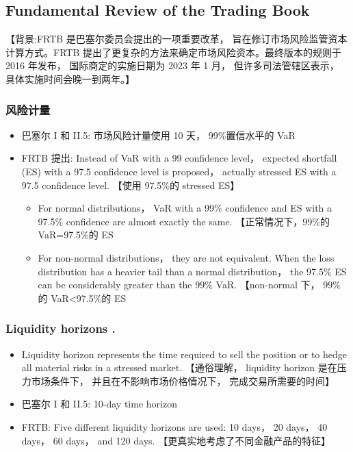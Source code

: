 \subsection{ Fundamental Review of the Trading Book}
【背景:FRTB 是巴塞尔委员会提出的一项重要改革， 旨在修订市场风险监管资本计算方式。FRTB 提出了更复杂的方法来确定市场风险资本。最终版本的规则于 2016 年发布， 国际商定的实施日期为 2023 年 1 月， 但许多司法管辖区表示， 具体实施时间会晚一到两年。】

\subsubsection{风险计量}




\begin{itemize}
\item 巴塞尔 I 和 II.5: 市场风险计量使用 10 天， 99\%置信水平的 VaR

\item FRTB 提出: Instead of VaR with a 99 confidence level， expected shortfall (ES) with a 97.5 confidence level is proposed， actually stressed ES with a 97.5 confidence level. 【使用 97.5\%的 stressed ES】

    \begin{itemize}
    \item For normal distributions， VaR with a 99\% confidence and ES with a 97.5\% confidence are almost exactly the same. 【正常情况下，99\%的 VaR=97.5\%的 ES
    \item For non-normal distributions， they are not equivalent. When the loss distribution has a heavier tail than a normal distribution， the 97.5\% ES can be considerably greater than the \({99}\%\) VaR. 【non-normal 下， \({99}\%\) 的 VaR<97.5\%的 ES
    \end{itemize}
\end{itemize}

\subsubsection{Liquidity horizons .}
    \begin{itemize}
    \item Liquidity horizon represents the time required to sell the position or to hedge all material risks in a stressed market. 【通俗理解， liquidity horizon 是在压力市场条件下， 并且在不影响市场价格情况下， 完成交易所需要的时间】
    \item 巴塞尔 I 和 II.5: 10-day time horizon
    \item FRTB: Five different liquidity horizons are used: 10 days， 20 days， 40 days， 60 days， and 120 days. 【更真实地考虑了不同金融产品的特征】
    \end{itemize}

